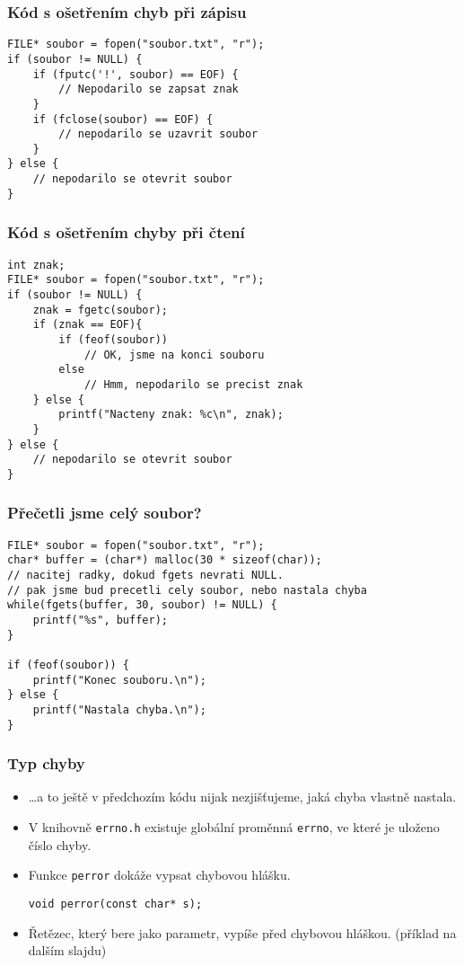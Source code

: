 \documentclass{beamer}
\newenvironment{itemizex}%
  {\large \begin{itemize}%
    \setlength{\itemsep}{8pt}%
    \setlength{\parskip}{8pt}}%
  {\end{itemize}}
\begin{document}
\begin{frame}[t,fragile]\frametitle{Kód s ošetřením chyb při zápisu} 
\begin{verbatim} 
FILE* soubor = fopen("soubor.txt", "r");
if (soubor != NULL) { 
    if (fputc('!', soubor) == EOF) {
        // Nepodarilo se zapsat znak
    }
    if (fclose(soubor) == EOF) {
        // nepodarilo se uzavrit soubor
    }
} else {
    // nepodarilo se otevrit soubor
}
\end{verbatim}
\end{frame}


\begin{frame}[t,fragile]\frametitle{Kód s ošetřením chyby při čtení} 
\begin{verbatim} 
int znak;
FILE* soubor = fopen("soubor.txt", "r");
if (soubor != NULL) {
    znak = fgetc(soubor);
    if (znak == EOF){
        if (feof(soubor))
            // OK, jsme na konci souboru
        else 
            // Hmm, nepodarilo se precist znak
    } else {
        printf("Nacteny znak: %c\n", znak);
    }
} else {
    // nepodarilo se otevrit soubor
}
\end{verbatim}
\end{frame}


\begin{frame}[t,fragile]\frametitle{Přečetli jsme celý soubor?} 
\begin{verbatim} 
FILE* soubor = fopen("soubor.txt", "r");
char* buffer = (char*) malloc(30 * sizeof(char));
// nacitej radky, dokud fgets nevrati NULL.
// pak jsme bud precetli cely soubor, nebo nastala chyba
while(fgets(buffer, 30, soubor) != NULL) {
    printf("%s", buffer);
}

if (feof(soubor)) {
    printf("Konec souboru.\n");
} else {
    printf("Nastala chyba.\n");
}
\end{verbatim}
\end{frame}


\begin{frame}[t,fragile]\frametitle{Typ chyby} 
    \begin{itemizex}
        \item \dots a to ještě v předchozím kódu nijak nezjišťujeme, jaká chyba vlastně nastala. 
        \item V knihovně \texttt{errno.h} existuje globální proměnná \texttt{errno}, ve které je uloženo číslo chyby. 
        \item Funkce \texttt{perror} dokáže vypsat chybovou hlášku. 
\begin{verbatim} 
void perror(const char* s);
\end{verbatim}
        \item Řetězec, který bere jako parametr, vypíše před chybovou hláškou. (příklad na dalším slajdu)
    \end{itemizex}
\end{frame}
\end{document}
